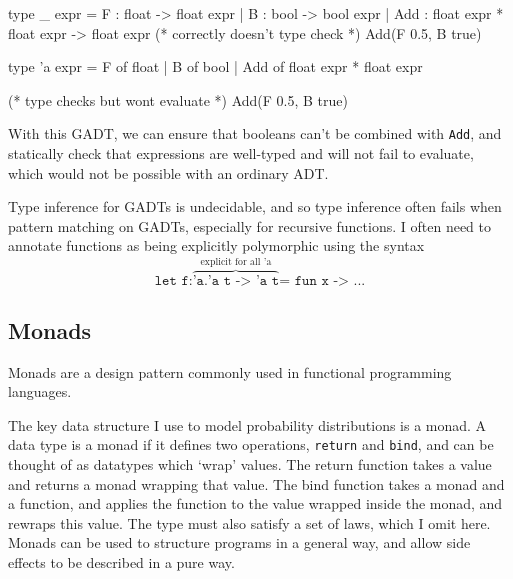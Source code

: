 \begin{figure*}[!hbt]
	\begin{minipage}{0.5\linewidth}
		\begin{ocamlcode-in}
			type _ expr = 
			    F   : float -> float expr
			  | B   : bool -> bool expr
			  | Add : float expr * float expr 
			        -> float expr
			(* correctly doesn't type check *)
			Add(F 0.5, B true)
		\end{ocamlcode-in}
	\end{minipage}
	\begin{minipage}{0.5\linewidth}
		\begin{ocamlcode-in}
			type 'a expr = 
			    F   of float 
			  | B   of bool 
			  | Add of float expr * float expr 
			
			(* type checks but wont evaluate *)
			Add(F 0.5, B true)
		\end{ocamlcode-in}
	\end{minipage}
\end{figure*}

With this GADT, we can ensure that booleans can't be combined with \texttt{Add}, and statically check that expressions are well-typed and will not fail to evaluate, which would not be possible with an ordinary ADT.
	
Type inference for GADTs is undecidable, and so type inference often fails when pattern matching on GADTs, especially for recursive functions. I often need to annotate functions as being explicitly polymorphic using the syntax
$$\texttt{let f:}\overbrace{\texttt{'a.'a t -> 'a t}}^{\text{explicit for all 'a}}\texttt{= fun x -> ...}$$
	
\subsection{Monads}
Monads are a design pattern commonly used in functional programming languages.
	
The key data structure I use to model probability distributions is a monad. A data type is a monad if it defines two operations, \texttt{return} and \texttt{bind}, and can be thought of as datatypes which `wrap' values. The return function takes a value and returns a monad wrapping that value. The bind function takes a monad and a function, and applies the function to the value wrapped inside the monad, and rewraps this value. The type must also satisfy a set of laws, which I omit here\cite{wadler1990comprehending}. Monads can be used to structure programs in a general way, and allow side effects to be described in a pure way.
	
